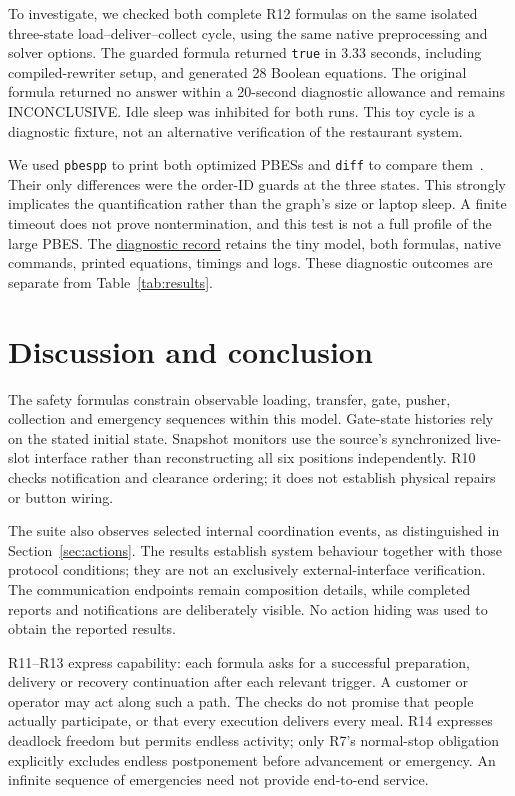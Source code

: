 \documentclass[11pt,a4paper]{article}
\begin{document}
To investigate, we checked both complete R12 formulas on the same isolated three-state load--deliver--collect cycle, using the same native preprocessing and solver options. The guarded formula returned \texttt{true} in 3.33 seconds, including compiled-rewriter setup, and generated 28 Boolean equations. The original formula returned no answer within a 20-second diagnostic allowance and remains INCONCLUSIVE. Idle sleep was inhibited for both runs. This toy cycle is a diagnostic fixture, not an alternative verification of the restaurant system.

We used \texttt{pbespp} to print both optimized PBESs and \texttt{diff} to compare them~\cite{pbespp}. Their only differences were the order-ID guards at the three states. This strongly implicates the quantification rather than the graph's size or laptop sleep. A finite timeout does not prove nontermination, and this test is not a full profile of the large PBES. The \href{../verification/r12-diagnostic/README.md}{diagnostic record} retains the tiny model, both formulas, native commands, printed equations, timings and logs. These diagnostic outcomes are separate from Table~\ref{tab:results}.

\clearpage
\section{Discussion and conclusion}
\label{sec:discussion}

The safety formulas constrain observable loading, transfer, gate, pusher, collection and emergency sequences within this model. Gate-state histories rely on the stated initial state. Snapshot monitors use the source's synchronized live-slot interface rather than reconstructing all six positions independently. R10 checks notification and clearance ordering; it does not establish physical repairs or button wiring.

The suite also observes selected internal coordination events, as distinguished in Section~\ref{sec:actions}. The results establish system behaviour together with those protocol conditions; they are not an exclusively external-interface verification. The communication endpoints remain composition details, while completed reports and notifications are deliberately visible. No action hiding was used to obtain the reported results.

R11--R13 express capability: each formula asks for a successful preparation, delivery or recovery continuation after each relevant trigger. A customer or operator may act along such a path. The checks do not promise that people actually participate, or that every execution delivers every meal. R14 expresses deadlock freedom but permits endless activity; only R7's normal-stop obligation explicitly excludes endless postponement before advancement or emergency. An infinite sequence of emergencies need not provide end-to-end service.
\end{document}
